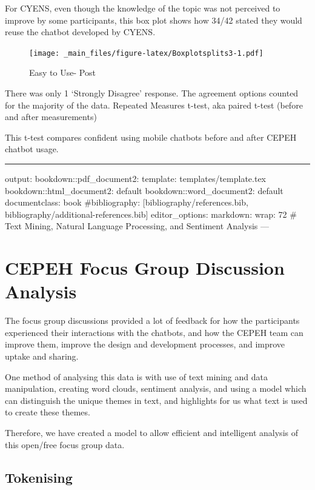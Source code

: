 \documentclass[a4paper, nobind]{templates/ociamthesis}
\begin{document}
For CYENS, even though the knowledge of the topic was not perceived to
improve by some participants, this box plot shows how 34/42 stated they
would reuse the chatbot developed by CYENS.

\begin{figure}
\centering
\texttt{[image: \_main\_files/figure-latex/Boxplotsplits3-1.pdf]}
\caption{\label{fig:Boxplotsplits3}Easy to Use- Post}
\end{figure}

There was only 1 `Strongly Disagree' response. The agreement options
counted for the majority of the data.
Repeated Measures t-test, aka paired t-test (before and after
measurements)

This t-test compares confident using mobile chatbots before and after
CEPEH chatbot usage.

\begin{center}\rule{0.5\linewidth}{0.5pt}\end{center}

output:
bookdown::pdf\_document2:
template: templates/template.tex
bookdown::html\_document2: default
bookdown::word\_document2: default
documentclass: book
\#bibliography: {[}bibliography/references.bib, bibliography/additional-references.bib{]}
editor\_options:
markdown:
wrap: 72
\# Text Mining, Natural Language Processing, and Sentiment Analysis
---

\hypertarget{cepeh-focus-group-discussion-analysis}{%
\chapter{CEPEH Focus Group Discussion Analysis}\label{cepeh-focus-group-discussion-analysis}}

The focus group discussions provided a lot of feedback for how the
participants experienced their interactions with the chatbots, and how
the CEPEH team can improve them, improve the design and development
processes, and improve uptake and sharing.

One method of analysing this data is with use of text mining and data
manipulation, creating word clouds, sentiment analysis, and using a
model which can distinguish the unique themes in text, and highlights
for us what text is used to create these themes.

Therefore, we have created a model to allow efficient and intelligent
analysis of this open/free focus group data.

\hypertarget{tokenising}{%
\section{Tokenising}\label{tokenising}}
\end{document}

